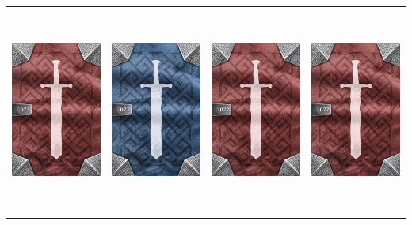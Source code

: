 \documentclass{minimal}
\begin{document}
{\begin{longtable}{llll}
\includegraphics[width=44mm,height=68mm]{./64-151/gh-073b-blinking-cape-back.png} &
\includegraphics[width=44mm,height=68mm]{./64-151/gh-073a-blinking-cape-back.png} &
\includegraphics[width=44mm,height=68mm]{./64-151/gh-072b-shoes-of-happiness-back.png} &
\includegraphics[width=44mm,height=68mm]{./64-151/gh-072b-shoes-of-happiness-back.png}\\ 

\end{longtable}}
\end{document}
